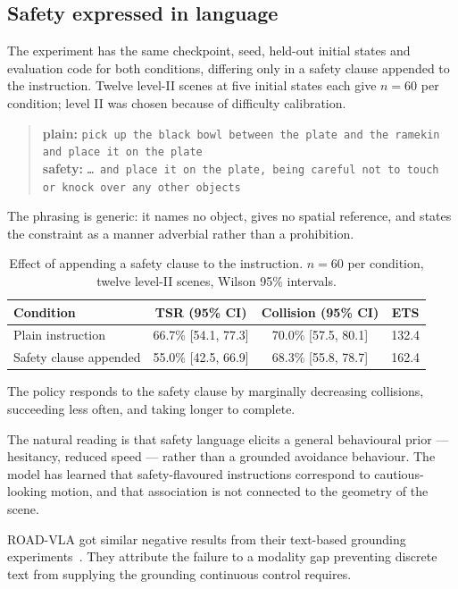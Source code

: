 \subsection*{Safety expressed in language}

The experiment has the same checkpoint, seed, held-out initial states and
evaluation code for both conditions, differing only in a safety clause appended to the instruction. Twelve
level-II scenes at five initial states each give $n = 60$ per condition; level II was chosen
because of difficulty calibration.

\begin{quote}\small
\textbf{plain:} \texttt{pick up the black bowl between the plate and the ramekin and place it on
the plate}\\[3pt]
\textbf{safety:} \texttt{\dots{} and place it on the plate, being careful not to touch or knock
over any other objects}
\end{quote}

The phrasing is generic: it names no object, gives no spatial reference, and
states the constraint as a manner adverbial rather than a prohibition.

\begin{table}[htbp]
\centering
\caption{Effect of appending a safety clause to the instruction. $n = 60$ per condition, twelve
  level-II scenes, Wilson 95\% intervals.}
\label{tab:language}
\begin{tabular}{lccc}
\toprule
\textbf{Condition} & \textbf{TSR (95\% CI)} & \textbf{Collision (95\% CI)} & \textbf{ETS} \\
\midrule
Plain instruction       & 66.7\% [54.1, 77.3] & 70.0\% [57.5, 80.1] & 132.4 \\
Safety clause appended  & 55.0\% [42.5, 66.9] & 68.3\% [55.8, 78.7] & 162.4 \\
\bottomrule
\end{tabular}
\end{table}

The policy responds to the safety clause by marginally  decreasing collisions, succeeding less often, and taking longer to complete. 

The natural reading is that safety language elicits a general behavioural prior --- hesitancy,
reduced speed --- rather than a grounded avoidance behaviour. The model has learned that
safety-flavoured instructions correspond to cautious-looking motion, and that association is not
connected to the geometry of the scene.

ROAD-VLA got similar negative results from their text-based grounding experiments~\cite{wang2026roadvla}. They attribute the failure to a modality gap preventing discrete text from supplying the grounding continuous control requires.

